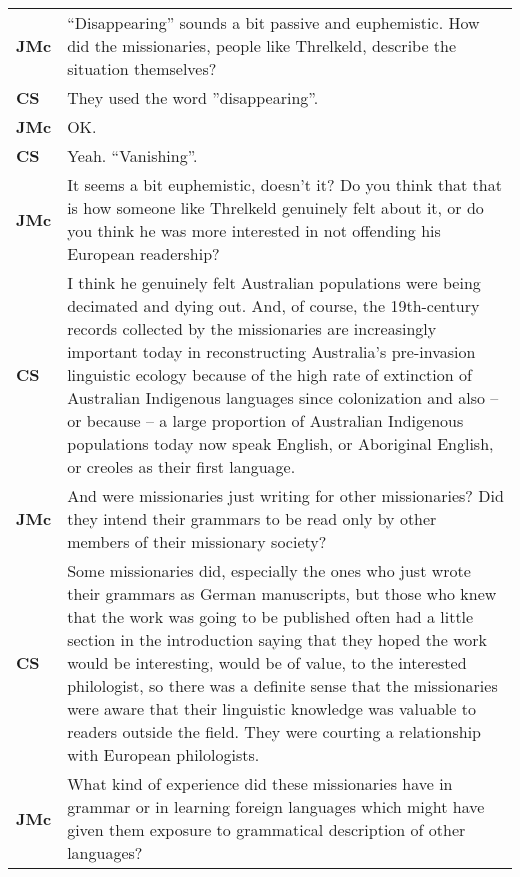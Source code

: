 \documentclass[12pt]{article}
\begin{document}
\begin{flushleft}
\begin{supertabular}{m{0.24415985in}m{5.89766in}}
\textbf{JMc}\newline
 &
“Disappearing” sounds a bit passive and euphemistic. How did the missionaries, people like Threlkeld, describe the situation themselves?\\
\textbf{CS}\newline
 &
They used the word ”disappearing”.\\
\textbf{JMc}\newline
 &
OK.\\
\textbf{CS}\newline
 &
Yeah. “Vanishing”.\\
\textbf{JMc}\newline
 &
It seems a bit euphemistic, doesn’t it? Do you think that that is how someone like Threlkeld genuinely felt about it, or do you think he was more interested in not offending his European readership?\\
\textbf{CS}\newline
 &
I think he genuinely felt Australian populations were being decimated and dying out. And, of course, the 19th-century records collected by the missionaries are increasingly important today in reconstructing Australia’s pre-invasion linguistic ecology because of the high rate of extinction of Australian Indigenous languages since colonization and also – or because – a large proportion of Australian Indigenous populations today now speak English, or Aboriginal English, or creoles as their first language.\\
\textbf{JMc}\newline
 &
And were missionaries just writing for other missionaries? Did they intend their grammars to be read only by other members of their missionary society?\\
\textbf{CS}\newline
 &
Some missionaries did, especially the ones who just wrote their grammars as German manuscripts, but those who knew that the work was going to be published often had a little section in the introduction saying that they hoped the work would be interesting, would be of value, to the interested philologist, so there was a definite sense that the missionaries were aware that their linguistic knowledge was valuable to readers outside the field. They were courting a relationship with European philologists.\\
\textbf{JMc}\newline
 &
What kind of experience did these missionaries have in grammar or in learning foreign languages which might have given them exposure to grammatical description of other languages?\\

\end{supertabular}
\end{flushleft}
\end{document}
